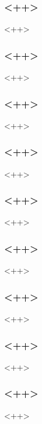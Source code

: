 \begin{frame}[fragile] %
\frametitle{<++>}
<++>
\end{frame}

\begin{frame}[fragile] %
\frametitle{<++>}
<++>
\end{frame}

\begin{frame}[fragile] %
\frametitle{<++>}
<++>
\end{frame}

\begin{frame}[fragile] %
\frametitle{<++>}
<++>
\end{frame}

\begin{frame}[fragile] %
\frametitle{<++>}
<++>
\end{frame}

\begin{frame}[fragile] %
\frametitle{<++>}
<++>
\end{frame}

\begin{frame}[fragile] %
\frametitle{<++>}
<++>
\end{frame}

\begin{frame}[fragile] %
\frametitle{<++>}
<++>
\end{frame}

\begin{frame}[fragile] %
\frametitle{<++>}
<++>
\end{frame}


